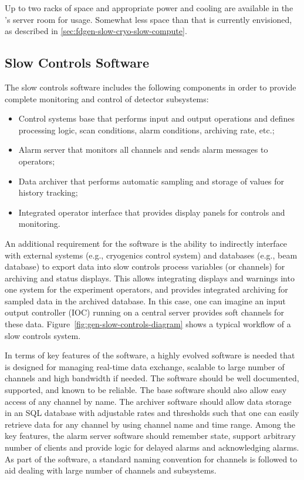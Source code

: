 Up to two racks of space and appropriate power and cooling are
available in the 's  server room for  usage.
Somewhat less space than that is currently envisioned, as described in
\ref{sec:fdgen-slow-cryo-slow-compute}.

\subsection{Slow Controls Software}
\label{sec:fdgen-slow-cryo-sw}


The slow controls software includes the following components in order 
to provide complete monitoring and control of detector subsystems:
%
\begin{itemize}
 \item{Control systems base} that performs input and output operations
  and defines processing logic, scan conditions, alarm conditions,
  archiving rate, etc.;
 \item{Alarm server} that monitors all channels and sends alarm
  messages to operators; 
 \item{Data archiver} that performs automatic sampling and storage of
  values for history tracking;
 \item{Integrated operator interface} that provides display panels for
  controls and monitoring.
\end{itemize}

An additional requirement for the software is the ability to indirectly
interface with external systems (e.g., cryogenics control
system) and databases (e.g., beam database) to export data into
slow controls process variables (or channels) for archiving and status
displays. This allows integrating displays and warnings into one
system for the experiment operators, and %
provides integrated
archiving for sampled data in the archived database. In this case, one
can imagine an input output controller (IOC) running on a central 
server provides soft channels for these data.
Figure~\ref{fig:gen-slow-controls-diagram} shows a typical workflow of a
slow controls system.

In terms of key features of the software, a highly evolved software is
needed that is designed for managing real-time data exchange, scalable
to large number of channels and high bandwidth if needed. The software
should be well documented, supported, and known to be reliable. The base
software should also allow easy access of any channel by name. The
archiver software should allow data storage in an SQL database with
adjustable rates and thresholds such that one can easily retrieve data
for any channel by using channel name and time range. Among the key
features, the alarm server software should remember state, support
arbitrary number of clients and provide logic for delayed alarms and
acknowledging alarms. As part of the software, a standard naming
convention for channels is followed to aid dealing with large
number of channels and subsystems.


